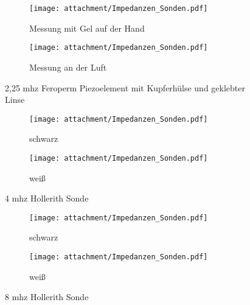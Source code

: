 \begin{figure}[ht!]
	\centering
	\begin{subfigure}[t!]{0.82\textwidth}
	  	\centering
  		\texttt{[image: attachment/Impedanzen\_Sonden.pdf]} %
  		\caption{Messung mit Gel auf der Hand}
 		\label{fig:snr_2_script}
  	\end{subfigure}
  	\begin{subfigure}[t!]{0.82\textwidth}
	  	\centering
  		\texttt{[image: attachment/Impedanzen\_Sonden.pdf]} %
  		\caption{Messung an der Luft}
 		\label{fig:snr_2_script}
  	\end{subfigure}
  	\caption{2,25 \acs{mhz} Feroperm Piezoelement mit Kupferhülse und geklebter Linse}
\end{figure}
\clearpage

\begin{figure}[ht!]
	\centering
	\begin{subfigure}[t!]{0.82\textwidth}
	  	\centering
  		\texttt{[image: attachment/Impedanzen\_Sonden.pdf]} %
  		\caption{schwarz}
 		\label{fig:snr_2_script}
  	\end{subfigure}
  	\begin{subfigure}[t!]{0.82\textwidth}
	  	\centering
  		\texttt{[image: attachment/Impedanzen\_Sonden.pdf]} %
  		\caption{weiß}
 		\label{fig:snr_2_script}
  	\end{subfigure}
  	\caption{4 \acs{mhz} Hollerith Sonde}
\end{figure}
\clearpage


\begin{figure}[ht!]
	\centering
	\begin{subfigure}[t!]{0.82\textwidth}
	  	\centering
  		\texttt{[image: attachment/Impedanzen\_Sonden.pdf]} %
  		\caption{schwarz}
 		\label{fig:snr_2_script}
  	\end{subfigure}
  	\begin{subfigure}[t!]{0.82\textwidth}
	  	\centering
  		\texttt{[image: attachment/Impedanzen\_Sonden.pdf]} %
  		\caption{weiß}
 		\label{fig:snr_2_script}
  	\end{subfigure}
  	\caption{8 \acs{mhz} Hollerith Sonde}
\end{figure}
\clearpage
